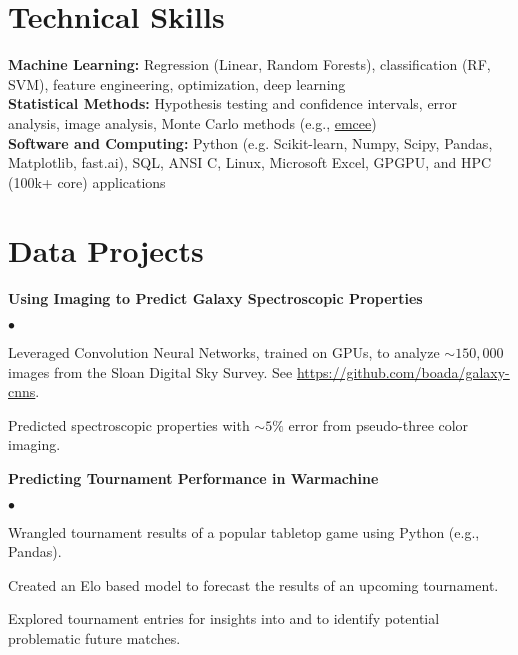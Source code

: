 \documentclass[margin,line, 11pt]{res}
\newenvironment{list2}{
  \begin{list}{$\bullet$}{%
      \setlength{\itemsep}{0in}
      \setlength{\parsep}{0in} \setlength{\parskip}{0in}
      \setlength{\topsep}{0in} \setlength{\partopsep}{0in}
      \setlength{\leftmargin}{0.2in}}}{\end{list}}
\begin{document}
\begin{resume}
\section{Technical Skills}
\textbf{Machine Learning:} Regression (Linear, Random Forests), classification (RF, SVM), feature engineering, optimization, deep learning\\
\textbf{Statistical Methods:} Hypothesis testing and confidence intervals, error analysis, image analysis, Monte Carlo methods (e.g., \href{https://github.com/dfm/emcee}{emcee})\\
\textbf{Software and Computing:}  Python (e.g. Scikit-learn, Numpy, Scipy, Pandas, Matplotlib, fast.ai), SQL, ANSI C, Linux, Microsoft Excel, GPGPU, and HPC (100k+ core) applications\\
\vspace*{-10mm}

\section{Data Projects}
\textbf{Using Imaging to Predict Galaxy Spectroscopic Properties}\newline
    \begin{list2}
    	\vspace*{-5mm}
    	\item Leveraged Convolution Neural Networks, trained on GPUs, to analyze $\sim150,000$ images from the Sloan Digital Sky Survey. See \url{https://github.com/boada/galaxy-cnns}.
    	\item Predicted spectroscopic properties with $\sim5\%$ error from pseudo-three color imaging.
    \end{list2}
    \vspace*{-4mm}
\textbf{Predicting Tournament Performance in Warmachine}\newline
    \begin{list2}
    	\vspace*{-5mm}
    	\item Wrangled tournament results of a popular tabletop game using Python (e.g., Pandas).
    	\item Created an Elo based model to forecast the results of an upcoming tournament.
    	\item Explored tournament entries for insights into and to identify potential problematic future matches.
    \end{list2}
\vspace*{-4mm}


\end{resume}
\end{document}
